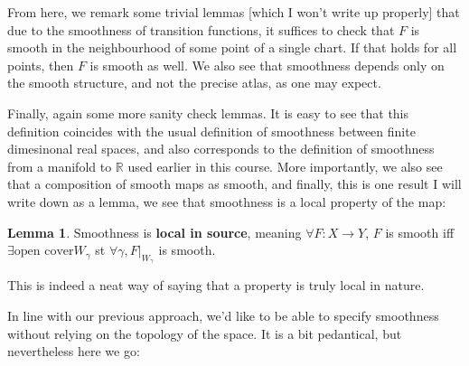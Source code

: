 \documentclass{article}
\theoremstyle{definition}
\newtheorem{lemma}{Lemma}
\begin{document}
From here, we remark some trivial lemmas [which I won't write up properly] that
due to the smoothness of transition functions, it suffices to check that $F$ is
smooth in the neighbourhood of some point of a single chart. If that holds for
all points, then $F$ is smooth as well. We also see that smoothness depends only
on the smooth structure, and not the precise atlas, as one may expect.

Finally, again some more sanity check lemmas. It is easy to see that this
definition coincides with the usual definition of smoothness between finite
dimesinonal real spaces, and also corresponds to the definition of smoothness
from a manifold to $\mathbb{R}$ used earlier in this course. More importantly,
we also see that a composition of smooth maps as smooth, and finally, this is
one result I will write down as a lemma, we see that smoothness is a local
property of the map:

\begin{lemma}
Smoothness is \textbf{local in source}, meaning $\forall F: X \to Y$, $F$ is
smooth iff $\exists \text{open cover} W_\gamma$ st $\forall \gamma, F
|_{W_\gamma}$ is smooth.
\end{lemma}

This is indeed a neat way of saying that a property is truly local in nature. 

In line with our previous approach, we'd like to be able to specify smoothness
without relying on the topology of the space. It is a bit pedantical, but
nevertheless here we go:
\end{document}
